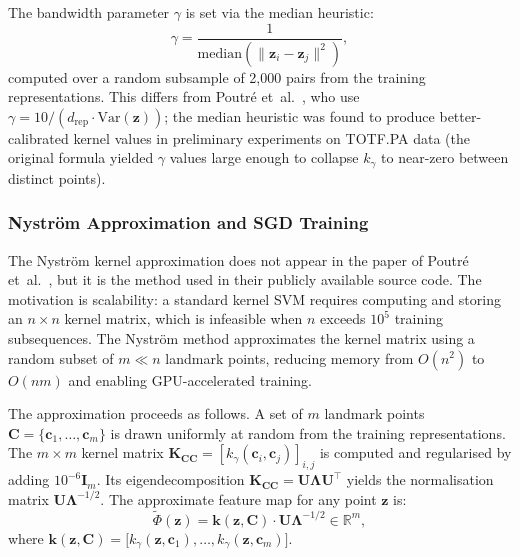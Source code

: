 \documentclass[11pt]{report}
\begin{document}
The bandwidth parameter $\gamma$ is set via the median heuristic:
\begin{equation}
  \label{eq:median_heuristic}
  \gamma = \frac{1}{\mathrm{median}\!\left(\|\mathbf{z}_i - \mathbf{z}_j\|^2\right)},
\end{equation}
computed over a random subsample of 2{,}000 pairs from the training representations. This differs from Poutr\'e et~al.~\cite{poutre_2024}, who use $\gamma = 10 / (d_{\text{rep}} \cdot \mathrm{Var}(\mathbf{z}))$; the median heuristic was found to produce better-calibrated kernel values in preliminary experiments on TOTF.PA data (the original formula yielded $\gamma$ values large enough to collapse $k_\gamma$ to near-zero between distinct points).

\subsubsection{Nystr\"om Approximation and SGD Training}\label{subsubsec:models:nystrom}

The Nystr\"om kernel approximation does not appear in the paper of Poutr\'e et~al.~\cite{poutre_2024}, but it is the method used in their publicly available source code. The motivation is scalability: a standard kernel SVM requires computing and storing an $n \times n$ kernel matrix, which is infeasible when $n$ exceeds $10^5$ training subsequences. The Nystr\"om method approximates the kernel matrix using a random subset of $m \ll n$ landmark points, reducing memory from $O(n^2)$ to $O(nm)$ and enabling GPU-accelerated training.

The approximation proceeds as follows. A set of $m$ landmark points $\mathbf{C} = \{\mathbf{c}_1, \ldots, \mathbf{c}_m\}$ is drawn uniformly at random from the training representations. The $m \times m$ kernel matrix $\mathbf{K}_{\mathbf{CC}} = [k_\gamma(\mathbf{c}_i, \mathbf{c}_j)]_{i,j}$ is computed and regularised by adding $10^{-6} \mathbf{I}_m$. Its eigendecomposition $\mathbf{K}_{\mathbf{CC}} = \mathbf{U} \boldsymbol{\Lambda} \mathbf{U}^\top$ yields the normalisation matrix $\mathbf{U} \boldsymbol{\Lambda}^{-1/2}$. The approximate feature map for any point $\mathbf{z}$ is:
\begin{equation}
  \label{eq:nystrom}
  \tilde{\Phi}(\mathbf{z}) = \mathbf{k}(\mathbf{z}, \mathbf{C}) \cdot \mathbf{U} \boldsymbol{\Lambda}^{-1/2} \in \mathbb{R}^m,
\end{equation}
where $\mathbf{k}(\mathbf{z}, \mathbf{C}) = \bigl[k_\gamma(\mathbf{z}, \mathbf{c}_1), \ldots, k_\gamma(\mathbf{z}, \mathbf{c}_m)\bigr]$.
\end{document}
